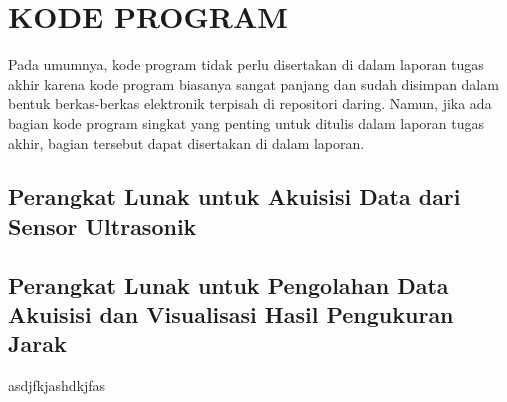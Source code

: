 \cleardoublepage
\chapter{KODE PROGRAM}
Pada umumnya, kode program tidak perlu disertakan di dalam laporan tugas akhir karena kode program biasanya sangat panjang
dan sudah disimpan dalam bentuk berkas-berkas elektronik terpisah di repositori daring. 
Namun, jika ada bagian kode program singkat yang penting untuk ditulis dalam laporan tugas akhir, 
bagian tersebut dapat disertakan di dalam laporan.
\section{Perangkat Lunak untuk Akuisisi Data dari Sensor Ultrasonik}
  
\section{Perangkat Lunak untuk Pengolahan Data Akuisisi dan Visualisasi Hasil Pengukuran Jarak} 
asdjfkjashdkjfas
